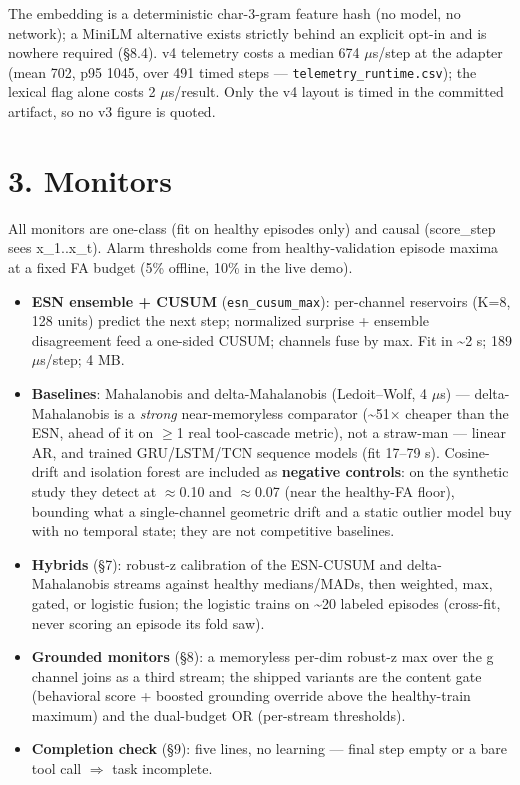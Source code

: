 \documentclass[11pt]{article}
\begin{document}
The embedding is a deterministic char-3-gram feature hash (no model, no network); a MiniLM alternative exists strictly behind an explicit opt-in and is nowhere required (\S{}8.4). v4 telemetry costs a median 674 $\mu$s/step at the adapter (mean 702, p95 1045, over 491 timed steps --- \texttt{telemetry\_\allowbreak{}runtime.csv}); the lexical flag alone costs 2 $\mu$s/result. Only the v4 layout is timed in the committed artifact, so no v3 figure is quoted.


\section{3. Monitors}


All monitors are one-class (fit on healthy episodes only) and causal (score\_step sees x\_1..x\_t). Alarm thresholds come from healthy-validation episode maxima at a fixed FA budget (5\% offline, 10\% in the live demo).


\begin{itemize}
\item \textbf{ESN ensemble + CUSUM} (\texttt{esn\_\allowbreak{}cusum\_\allowbreak{}max}): per-channel reservoirs (K=8, 128 units) predict the next step; normalized surprise + ensemble disagreement feed a one-sided CUSUM; channels fuse by max. Fit in \textasciitilde{}2 s; 189 $\mu$s/step; 4 MB.
\item \textbf{Baselines}: Mahalanobis and delta-Mahalanobis (Ledoit--Wolf, 4 $\mu$s) --- delta-Mahalanobis is a \emph{strong} near-memoryless comparator (\textasciitilde{}51$\times$ cheaper than the ESN, ahead of it on $\geq$1 real tool-cascade metric), not a straw-man --- linear AR, and trained GRU/LSTM/TCN sequence models (fit 17--79 s). Cosine-drift and isolation forest are included as \textbf{negative controls}: on the synthetic study they detect at $\approx$0.10 and $\approx$0.07 (near the healthy-FA floor), bounding what a single-channel geometric drift and a static outlier model buy with no temporal state; they are not competitive baselines.
\item \textbf{Hybrids} (\S{}7): robust-z calibration of the ESN-CUSUM and delta-Mahalanobis streams against healthy medians/MADs, then weighted, max, gated, or logistic fusion; the logistic trains on \textasciitilde{}20 labeled episodes (cross-fit, never scoring an episode its fold saw).
\item \textbf{Grounded monitors} (\S{}8): a memoryless per-dim robust-z max over the g channel joins as a third stream; the shipped variants are the content gate (behavioral score + boosted grounding override above the healthy-train maximum) and the dual-budget OR (per-stream thresholds).
\item \textbf{Completion check} (\S{}9): five lines, no learning --- final step empty or a bare tool call $\Rightarrow$ task incomplete.
\end{itemize}
\end{document}
